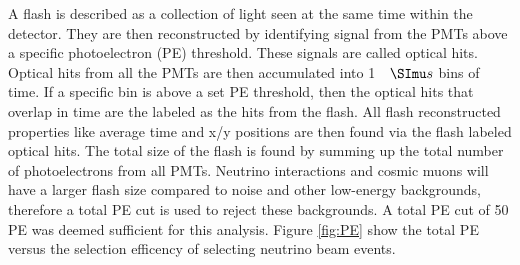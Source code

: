 A flash is described as a collection of light seen at the same time within the detector. They are then reconstructed by identifying signal from the PMTs above a specific photoelectron (PE) threshold. These signals are called optical hits. Optical hits from all the PMTs are then accumulated into 1 $\micro s$ bins of time. If a specific bin is above a set PE threshold, then the optical hits that overlap in time are the labeled as the hits from the flash. All flash reconstructed properties like average time and x/y positions are then found via the flash labeled optical hits. The total size of the flash is found by summing up the total number of photoelectrons from all PMTs. Neutrino interactions and cosmic muons will have a larger flash size compared to noise and other low-energy backgrounds, therefore a total PE cut is used to reject these backgrounds. A total PE cut of 50 PE was deemed sufficient for this analysis. Figure \ref{fig:PE} show the total PE versus the selection efficency of selecting neutrino beam events. 



